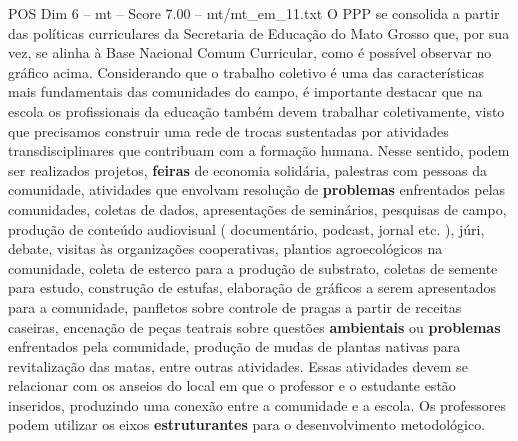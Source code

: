 \begin{textsample}{POS Dim 6 – mt – Score 7.00 – mt/mt\_em\_11.txt}
O PPP se consolida a partir das políticas curriculares da Secretaria de Educação do Mato Grosso que, por sua vez, se alinha à Base Nacional Comum Curricular, como é possível observar no gráfico acima.
Considerando que o trabalho coletivo é uma das características mais fundamentais das comunidades do campo, é importante destacar que na escola os profissionais da educação também devem trabalhar coletivamente, visto que precisamos construir uma rede de trocas sustentadas por atividades transdisciplinares que contribuam com a formação humana.
Nesse sentido, podem ser realizados projetos, \textbf{feiras} de economia solidária, palestras com pessoas da comunidade, atividades que envolvam resolução de \textbf{problemas} enfrentados pelas comunidades, coletas de dados, apresentações de seminários, pesquisas de campo, produção de conteúdo audiovisual ( documentário, podcast, jornal etc. ), júri, debate, visitas às organizações cooperativas, plantios agroecológicos na comunidade, coleta de esterco para a produção de substrato, coletas de semente para estudo, construção de estufas, elaboração de gráficos a serem apresentados para a comunidade, panfletos sobre controle de pragas a partir de receitas caseiras, encenação de peças teatrais sobre questões \textbf{ambientais} ou \textbf{problemas} enfrentados pela comunidade, produção de mudas de plantas nativas para revitalização das matas, entre outras atividades.
Essas atividades devem se relacionar com os anseios do local em que o professor e o estudante estão inseridos, produzindo uma conexão entre a comunidade e a escola.
Os professores podem utilizar os eixos \textbf{estruturantes} para o desenvolvimento metodológico.

\end{textsample}
